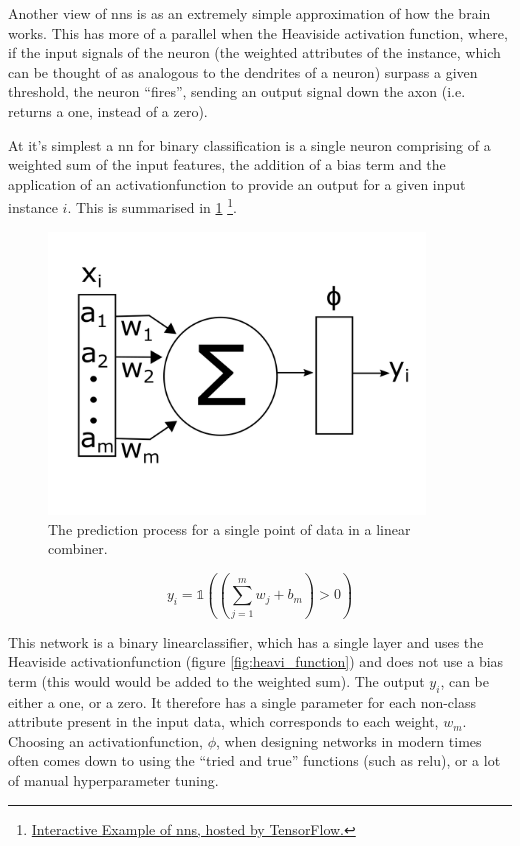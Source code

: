 Another view of \gls{nn}s is as an extremely simple approximation of how the brain works. This has more of a parallel when the Heaviside activation function, where, if the input signals of the neuron (the weighted attributes of the \gls{instance}, which can be thought of as analogous to the dendrites of a neuron) surpass a given threshold, the neuron \enquote{fires}, sending an output signal down the axon (i.e. returns a one, instead of a zero).
\bigskip

At it's simplest a \gls{nn} for binary classification is a single \gls{neuron} comprising of a weighted sum of the input features, the addition of a bias term and the application of an \gls{activationfunction} to provide an output for a given input \gls{instance} $i$. This is summarised in \ref{fig:nn_simple} \footnote{\href{https://playground.tensorflow.org/}{Interactive Example of \gls{nn}s, hosted by TensorFlow.}}.  
\bigskip

\begin{figure}[h]
    \centering
    \includegraphics[width=100mm]{figs/nn_simple.png}
    \caption{The prediction process for a single point of data in a linear combiner.}
    \label{fig:nn_simple}
\end{figure}

\begin{equation}
    y_i = \mathds{1} ((\sum_{j = 1}^m w_j + b_m) > 0)
    \label{eq:nn_simple_pred}
\end{equation}

This network is a binary \gls{linearclassifier}, which has a single \gls{layer} and uses the Heaviside \gls{activationfunction} (figure \ref{fig:heavi_function}) and does not use a bias term (this would would be added to the weighted sum). The output $y_i$, can be either a one, or a zero. It therefore has a single parameter for each non-class attribute present in the input data, which corresponds to each weight, $w_m$. Choosing an \gls{activationfunction}, $\phi$, when designing networks in modern times often comes down to using the \enquote{tried and true} functions (such as \gls{relu}), or a lot of manual \gls{hyperparameter} tuning.

